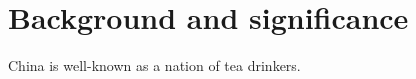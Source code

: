 \section{Background and significance}\label{sec:background-significance}

China is well-known as a nation of tea drinkers.
